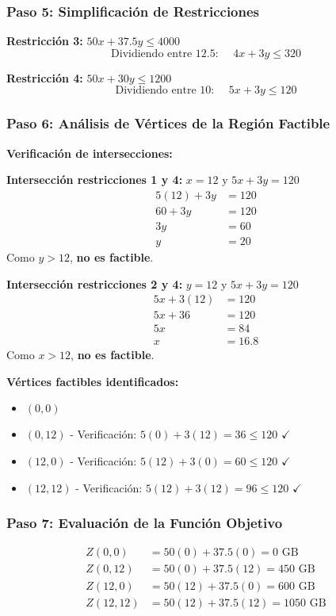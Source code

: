 \documentclass[12pt]{article}
\begin{document}
	\subsubsection*{Paso 5: Simplificación de Restricciones}
	\textbf{Restricción 3:} $50x + 37.5y \leq 4000$
	\begin{equation}
		\text{Dividiendo entre 12.5: } \quad 4x + 3y \leq 320
	\end{equation}
	
	\textbf{Restricción 4:} $50x + 30y \leq 1200$
	\begin{equation}
		\text{Dividiendo entre 10: } \quad 5x + 3y \leq 120
	\end{equation}
	
	\subsubsection*{Paso 6: Análisis de Vértices de la Región Factible}
	
	\textbf{Verificación de intersecciones:}
	
	\textbf{Intersección restricciones 1 y 4:} $x = 12$ y $5x + 3y = 120$
	\begin{align}
		5(12) + 3y &= 120\\
		60 + 3y &= 120\\
		3y &= 60\\
		y &= 20
	\end{align}
	Como $y > 12$, \textbf{no es factible}.
	
	\textbf{Intersección restricciones 2 y 4:} $y = 12$ y $5x + 3y = 120$
	\begin{align}
		5x + 3(12) &= 120\\
		5x + 36 &= 120\\
		5x &= 84\\
		x &= 16.8
	\end{align}
	Como $x > 12$, \textbf{no es factible}.
	
	\textbf{Vértices factibles identificados:}
	\begin{itemize}
		\item $(0, 0)$
		\item $(0, 12)$ - Verificación: $5(0) + 3(12) = 36 \leq 120$ $\checkmark$
		\item $(12, 0)$ - Verificación: $5(12) + 3(0) = 60 \leq 120$ $\checkmark$
		\item $(12, 12)$ - Verificación: $5(12) + 3(12) = 96 \leq 120$ $\checkmark$
	\end{itemize}
	
	\subsubsection*{Paso 7: Evaluación de la Función Objetivo}
	\begin{align}
		Z(0, 0) &= 50(0) + 37.5(0) = 0 \text{ GB}\\
		Z(0, 12) &= 50(0) + 37.5(12) = 450 \text{ GB}\\
		Z(12, 0) &= 50(12) + 37.5(0) = 600 \text{ GB}\\
		Z(12, 12) &= 50(12) + 37.5(12) = 1050 \text{ GB}
	\end{align}
	
\end{document}
